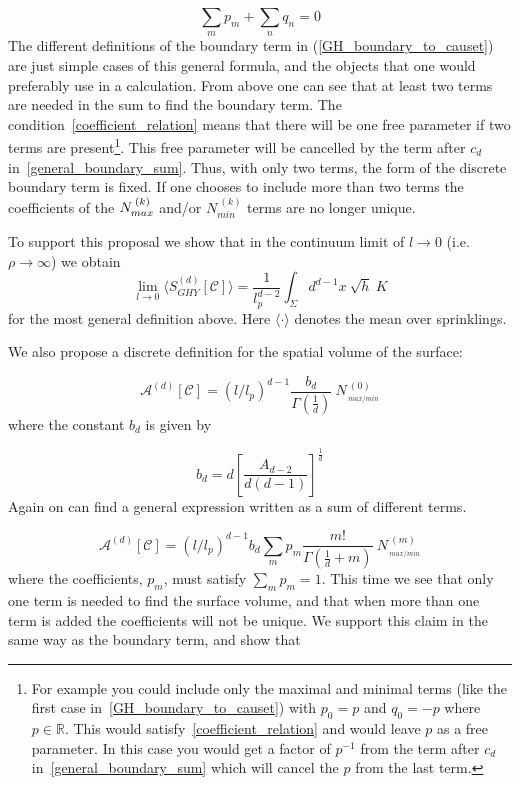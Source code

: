 \documentclass[12pt]{article}
\newcommand{\be}{\begin{equation}}
\newcommand{\ee}{\end{equation}}
\begin{document}
\be\label{coefficient_relation}
\sum_m p_m + \sum_n q_n = 0
\ee
The different definitions of the boundary term in (\ref{GH_boundary_to_causet}) are just simple cases of this general formula, and the objects that one would preferably use in a calculation. From above one can see that at least two terms are needed in the sum to find the boundary term. The condition~\eqref{coefficient_relation} means that there will be one free parameter if two terms are present\footnote{For example you could include only the maximal and minimal terms (like the first case in~\eqref{GH_boundary_to_causet}) with $p_0=p$ and $q_0=-p$ where $p\in\mathbb{R}$. This would satisfy~\eqref{coefficient_relation} and would leave $p$ as a free parameter. In this case you would get a factor of $p^{-1}$ from the term after $c_d$ in~\eqref{general_boundary_sum} which will cancel the $p$ from the last term.}. This free parameter will be cancelled by the term after $c_d$ in~\eqref{general_boundary_sum}. Thus, with only two terms, the form of the discrete boundary term is fixed. If one chooses to include more than two terms the coefficients of the $N_{{max\vphantom{i}}}^{\:(k)}$ and/or $N_{{min}}^{\:(k)}$ terms are no longer unique.

To support this proposal we show that in the continuum limit of $l\rightarrow 0$ (i.e. $\rho\rightarrow\infty$) we obtain
\be
\lim_{l\rightarrow0}\langle S^{(d)}_{GHY}[\mathcal C] \rangle= \frac{1}{l_p^{d-2}}\int_{\Sigma} d^{d-1}x\: \sqrt{h}\: K\label{eq:mainconjecture}
\ee
for the most general definition above. Here $\langle\cdot\rangle$ denotes the mean over sprinklings.

We also propose a discrete definition for the spatial volume of the surface:

\be\label{eq:surface_volume}
\mathcal{A}^{(d)}[\mathcal{C}]=\left(l/l_p\right)^{d-1}\frac{b_{d}}{\Gamma\left(\frac{1}{d}\right)}\: N_{{\,}_{max/min}}^{\:(0)}
\ee
where the constant $b_d$ is given by

\be\label{constant_b_d}
b_d=d\left[\frac{A_{d-2}}{d(d-1)}\right]^{\frac{1}{d}}
\ee
Again on can find a general expression written as a sum of different terms.

\be\label{general_area_sum}
\mathcal{A}^{(d)}[\mathcal{C}]=\left(l/l_p\right)^{d-1}b_{d}\sum_m p_m \frac{m!}{\Gamma\left(\frac{1}{d}+m \right)}\: N_{{\,}_{max/min}}^{\:(m)}
\ee
where the coefficients, $p_m$, must satisfy $\sum_m p_m =1$. This time we see that only one term is needed to find the surface volume, and that when more than one term is added the coefficients will not be unique. We support this claim in the same way as the boundary term, and show that
\end{document}
